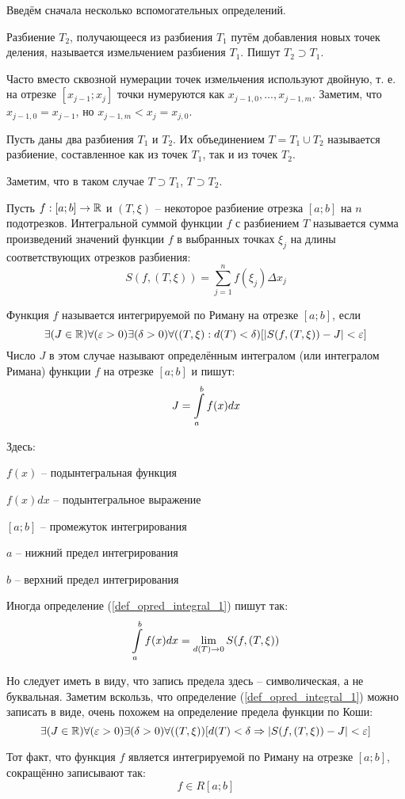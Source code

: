 Введём сначала несколько вспомогательных определений.

\opred
Разбиение $T_2$, получающееся из разбиения $T_1$ путём добавления новых точек деления, называется измельчением разбиения $T_1$.
Пишут $T_2 \supset T_1$.

Часто вместо сквозной нумерации точек измельчения используют двойную, т. е. на отрезке $[x_{j-1};x_j]$ точки нумеруются как $x_{j-1,0}, ..., x_{j-1,m}$.
Заметим, что $x_{j-1,0}=x_{j-1}$, но $x_{j-1,m}<x_j=x_{j,0}$.

\opred
Пусть даны два разбиения $T_1$ и $T_2$.
Их объединением $T=T_1 \cup T_2$ называется разбиение, составленное как из точек $T_1$, так и из точек $T_2$.

Заметим, что в таком случае $T\supset T_1$, $T\supset T_2$.

\opred
Пусть $f:[a;b]\to \mathbb{R}$ и $(T, \xi)$ -- некоторое разбиение отрезка $[a;b]$ на $n$ подотрезков.
Интегральной суммой функции $f$ с разбиением $T$ называется сумма произведений значений функции $f$ в выбранных точках $\xi_j$ на длины соответствующих отрезков разбиения:
$$S(f,(T,\xi))=\sum_{j=1}^n f(\xi_j)\Delta x_j$$

\begin{opr}\label{opr_opred_integral_1}
Функция $f$ называется интегрируемой по Риману на отрезке $[a;b]$, если
\begin{equation}\label{def_opred_integral_1}
\exists(J\in\mathbb{R})\forall(\varepsilon>0)\exists(\delta>0)\forall((T,\xi):d(T)<\delta)[|S(f,(T,\xi))-J|<\varepsilon]
\end{equation}
Число $J$ в этом случае называют определённым интегралом (или интегралом Римана) функции $f$ на отрезке $[a;b]$ и пишут:
$$
J=\int\limits_a^b f(x) dx
$$
\end{opr}

Здесь:

$f(x)$ -- подынтегральная функция

$f(x)dx$ -- подынтегральное выражение

$[a;b]$ -- промежуток интегрирования

$a$ -- нижний предел интегрирования

$b$ -- верхний предел интегрирования

Иногда определение (\ref{def_opred_integral_1}) пишут так:
$$
\int\limits_a^b f(x) dx = \lim_{d(T)\to 0} S(f,(T,\xi))
$$

Но следует иметь в виду, что запись предела здесь -- символическая, а не буквальная.
Заметим вскользь, что определение (\ref{def_opred_integral_1}) можно записать в виде, очень похожем на определение предела функции по Коши:
$$\exists(J\in\mathbb{R})\forall(\varepsilon>0)\exists(\delta>0)\forall((T,\xi))[d(T)<\delta \Rightarrow |S(f,(T,\xi))-J|<\varepsilon]
$$

Тот факт, что функция $f$ является интегрируемой по Риману на отрезке $[a;b]$, сокращённо записывают так:
$$f\in R[a;b]$$


